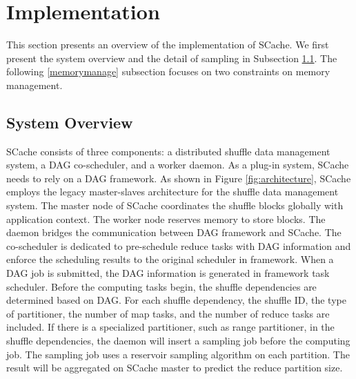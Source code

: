 \section{Implementation}\label{impl}
This section presents an overview of the implementation of SCache. 
{\color{black}
We first present the system overview and the detail of sampling in Subsection \ref{arch}. 
The following \ref{memorymanage} subsection focuses on two constraints on memory management.
}


\subsection{System Overview}\label{arch}
SCache consists of three components: a distributed shuffle data management system, a DAG co-scheduler, and a worker daemon. As a plug-in system, SCache needs to rely on a DAG framework.
As shown in Figure \ref{fig:architecture}, SCache employs the legacy master-slaves architecture for the shuffle data management system. 
The master node of SCache coordinates the shuffle blocks globally with application context. The worker node reserves memory to store blocks.
The daemon bridges the communication between DAG framework and SCache. The co-scheduler is dedicated to pre-schedule reduce tasks with DAG information and enforce the scheduling results to the original scheduler in framework.
When a DAG job is submitted, the DAG information is generated in framework task scheduler. 
Before the computing tasks begin, the shuffle dependencies are determined based on DAG.
For each shuffle dependency, the shuffle ID, the type of partitioner, the number of map tasks, and the number of reduce tasks are included. If there is a specialized partitioner, such as range partitioner, in the shuffle dependencies, the daemon will insert a sampling job before the computing job.
The sampling job uses a reservoir sampling algorithm \cite{reservoir} on each partition.
The result will be aggregated on SCache master to predict the reduce partition size.

